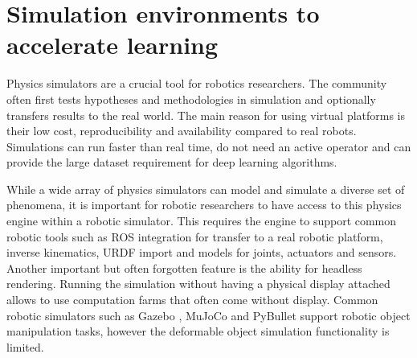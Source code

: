 \documentclass[\home/main.tex]{subfiles}
\begin{document}
\section{Simulation environments to accelerate learning} \label{sec:lit_simulation}

Physics simulators are a crucial tool for robotics researchers. The community often first tests hypotheses and methodologies in simulation and optionally transfers results to the real world. The main reason for using virtual platforms is their low cost, reproducibility and availability compared to real robots. Simulations can run faster than real time, do not need an active operator and can provide the large dataset requirement for deep learning algorithms.

While a wide array of physics simulators can model and simulate a diverse set of phenomena, it is important for robotic researchers to have access to this physics engine within a robotic simulator. This requires the engine to support common robotic tools such as ROS integration for transfer to a real robotic platform, inverse kinematics, URDF import and models for joints, actuators and sensors. Another important but often forgotten feature is the ability for headless rendering. Running the simulation without having a physical display attached allows to use computation farms that often come without display. Common robotic simulators \autocite{Collins2021} such as Gazebo \autocite{gazebo}, MuJoCo \autocite{mujoco} and PyBullet \autocite{pybullet} support robotic object manipulation tasks, however the deformable object simulation functionality is limited.
\end{document}
